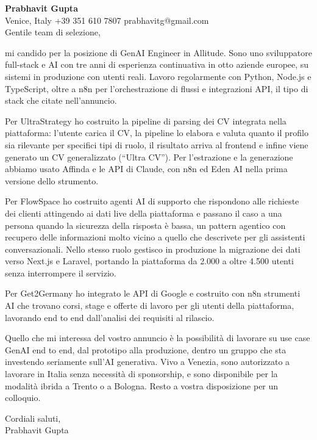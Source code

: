 \documentclass[a4paper,10.5pt]{article}
\begin{document}
\textbf{Prabhavit Gupta}\\
Venice, Italy \textbar{} +39 351 610 7807 \textbar{} prabhavitg@gmail.com\\[10pt]
Gentile team di selezione,

mi candido per la posizione di GenAI Engineer in Allitude. Sono uno sviluppatore full-stack e AI con tre anni di esperienza continuativa in otto aziende europee, su sistemi in produzione con utenti reali. Lavoro regolarmente con Python, Node.js e TypeScript, oltre a n8n per l'orchestrazione di flussi e integrazioni API, il tipo di stack che citate nell'annuncio.

Per UltraStrategy ho costruito la pipeline di parsing dei CV integrata nella piattaforma: l'utente carica il CV, la pipeline lo elabora e valuta quanto il profilo sia rilevante per specifici tipi di ruolo, il risultato arriva al frontend e infine viene generato un CV generalizzato (``Ultra CV''). Per l'estrazione e la generazione abbiamo usato Affinda e le API di Claude, con n8n ed Eden AI nella prima versione dello strumento.

Per FlowSpace ho costruito agenti AI di supporto che rispondono alle richieste dei clienti attingendo ai dati live della piattaforma e passano il caso a una persona quando la sicurezza della risposta è bassa, un pattern agentico con recupero delle informazioni molto vicino a quello che descrivete per gli assistenti conversazionali. Nello stesso ruolo gestisco in produzione la migrazione dei dati verso Next.js e Laravel, portando la piattaforma da 2.000 a oltre 4.500 utenti senza interrompere il servizio.

Per Get2Germany ho integrato le API di Google e costruito con n8n strumenti AI che trovano corsi, stage e offerte di lavoro per gli utenti della piattaforma, lavorando end to end dall'analisi dei requisiti al rilascio.

Quello che mi interessa del vostro annuncio è la possibilità di lavorare su use case GenAI end to end, dal prototipo alla produzione, dentro un gruppo che sta investendo seriamente sull'AI generativa. Vivo a Venezia, sono autorizzato a lavorare in Italia senza necessità di sponsorship, e sono disponibile per la modalità ibrida a Trento o a Bologna. Resto a vostra disposizione per un colloquio.

Cordiali saluti,\\
Prabhavit Gupta
\end{document}
